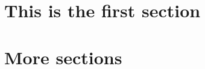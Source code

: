 \documentclass[a4paper,english]{article}
\begin{document}
\mytitlepage



\section{This is the first section}

% 
% 
% 
% 

\section{More sections}


% 
% 

% 
% 
% 
% 
% 

% 
% 
% 

% 
% 
% 
% 
% 
% 
% 

% 
% 
% 
% 


% 
% 
% 
% 
% 
% 
\end{document}
